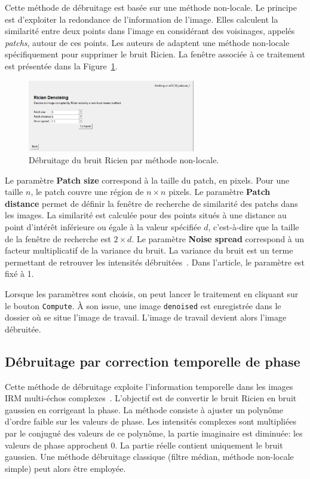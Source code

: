 \documentclass[french]{article}
\begin{document}
Cette méthode de débruitage est basée sur une méthode non-locale. Le
principe est d'exploiter la redondance de l'information de l'image.
Elles calculent la similarité entre deux points dans l'image en
considérant des voisinages, appelés \textit{patchs}, autour de ces
points. Les auteurs de \cite{Wiest08} adaptent une méthode non-locale
spécifiquement pour supprimer le bruit Ricien. La fenêtre associée à
ce traitement est présentée dans la
Figure~\ref{fig:denoising_nlmeans}.

\begin{figure}[ht]
  \centering
  \includegraphics[width=0.65\textwidth]{fig/denoising_nlmeans}
  \caption{Débruitage du bruit Ricien par méthode non-locale.}
  \label{fig:denoising_nlmeans}
\end{figure}

Le paramètre \textbf{Patch size} correspond à la taille du patch, en
pixels. Pour une taille $n$, le patch couvre une région de $n \times n$
pixels. Le paramètre \textbf{Patch distance} permet de définir la
fenêtre de recherche de similarité des patchs dans les images. La
similarité est calculée pour des points situés à une distance au point
d'intérêt inférieure ou égale à la valeur spécifiée $d$, c'est-à-dire
que la taille de la fenêtre de recherche est $2 \times d$. Le paramètre
\textbf{Noise spread} correspond à un facteur multiplicatif de la
variance du bruit. La variance du bruit est un terme permettant de
retrouver les intensités débruitées~\cite{Wiest08}. Dans
l'article, le paramètre est fixé à 1.

Lorsque les paramètres sont choisis, on peut lancer le traitement en
cliquant sur le bouton \texttt{Compute}. À son issue, une image
\texttt{denoised} est enregistrée dans le dossier où se situe l'image de
travail. L'image de travail devient alors l'image débruitée.


\subsection{Débruitage par correction temporelle de phase}
\label{sec:debr-par-corr}
Cette méthode de débruitage exploite l'information temporelle dans les
images IRM multi-échos complexes~\cite{Bjarnason13}. L'objectif est de convertir le bruit
Ricien en bruit gaussien en corrigeant la phase. La méthode consiste à
ajuster un polynôme d'ordre faible sur les valeurs de phase. Les
intensités complexes sont multipliées par le conjugué des valeurs de
ce polynôme, la partie imaginaire est diminuée: les valeurs de phase
approchent 0. La partie réelle contient uniquement le bruit gaussien.
Une méthode débruitage classique (filtre médian, méthode non-locale
simple) peut alors être employée.
\end{document}
